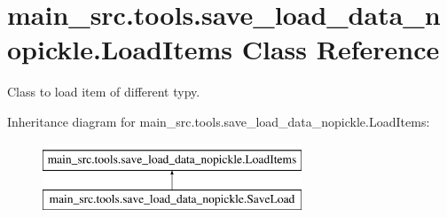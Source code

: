 \hypertarget{classmain__src_1_1tools_1_1save__load__data__nopickle_1_1LoadItems}{\section{main\-\_\-src.\-tools.\-save\-\_\-load\-\_\-data\-\_\-nopickle.\-Load\-Items Class Reference}
\label{classmain__src_1_1tools_1_1save__load__data__nopickle_1_1LoadItems}
}


Class to load item of different typy.  


Inheritance diagram for main\-\_\-src.\-tools.\-save\-\_\-load\-\_\-data\-\_\-nopickle.\-Load\-Items\-:\begin{figure}[H]
\begin{center}
\leavevmode
\includegraphics[height=2.000000cm]{classmain__src_1_1tools_1_1save__load__data__nopickle_1_1LoadItems}
\end{center}
\end{figure}
